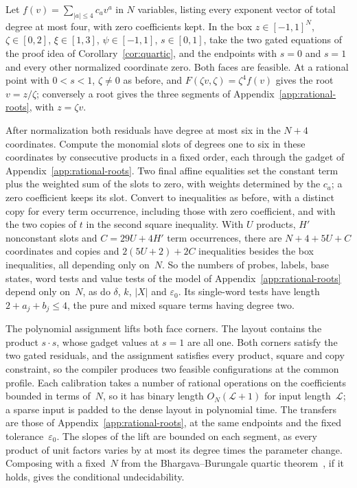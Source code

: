 Let $f(v)=\sum_{|a|\le4}c_av^a$ in $N$ variables, listing every exponent
vector of total degree at most four, with zero coefficients kept. In the
box $z\in[-1,1]^N$, $\zeta\in[0,2]$, $\xi\in[1,3]$, $\psi\in[-1,1]$,
$s\in[0,1]$, take the two gated equations of the proof idea of
Corollary~\ref{cor:quartic}, and the endpoints with $s=0$ and $s=1$ and
every other normalized coordinate zero. Both faces are feasible. At a
rational point with $0<s<1$, $\zeta\neq0$ as before, and
$F(\zeta v,\zeta)=\zeta^4f(v)$ gives the root $v=z/\zeta$; conversely a
root gives the three segments of Appendix~\ref{app:rational-roots}, with
$z=\zeta v$.

After normalization both residuals have degree at most six in the $N+4$
coordinates. Compute the monomial slots of degrees one to six in these
coordinates by consecutive products in a fixed order, each through the
gadget of Appendix~\ref{app:rational-roots}. Two final affine
equalities set the constant term plus the weighted sum of the slots to
zero, with weights determined by the $c_a$; a zero coefficient keeps its
slot. Convert to inequalities as before, with a distinct copy for every
term occurrence, including those with zero coefficient, and with the two
copies of $t$ in the second square inequality. With $U$ products, $H'$
nonconstant slots and $C=29U+4H'$ term occurrences, there are $N+4+5U+C$
coordinates and copies and $2(5U+2)+2C$ inequalities besides the box
inequalities, all depending only on~$N$. So the numbers of probes, labels,
base states, word tests and value tests of the model of
Appendix~\ref{app:rational-roots} depend only on~$N$, as do $\delta$, $k$,
$|X|$ and $\varepsilon_0$. Its single-word tests have length
$2+a_j+b_j\le4$, the pure and mixed square terms having degree two.

The polynomial assignment lifts both face corners. The layout contains the
product $s\cdot s$, whose gadget values at $s=1$ are all one. Both corners
satisfy the two gated residuals, and the assignment satisfies every
product, square and copy constraint, so the compiler produces two feasible
configurations at the common profile. Each calibration takes a number of
rational operations on the coefficients bounded in terms of~$N$, so it has
binary length $O_N(\mathcal L+1)$ for input length~$\mathcal L$; a sparse input is
padded to the dense layout in polynomial time. The transfers are
those of Appendix~\ref{app:rational-roots}, at the same endpoints and the
fixed tolerance~$\varepsilon_0$. The slopes of the lift are bounded on
each segment, as every product of unit factors varies by at most its
degree times the parameter change. Composing with a fixed~$N$ from
the Bhargava--Burungale quartic theorem~\cite[Corollary~1.2(3)]{bhargavaburungale}, if it
holds, gives the conditional undecidability.

